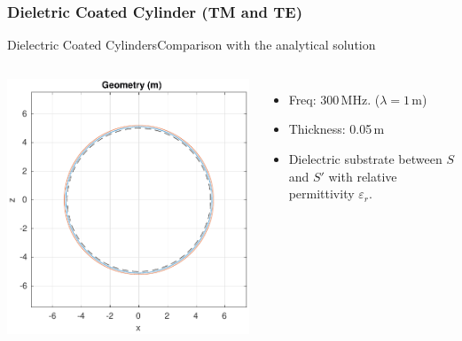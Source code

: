   \subsubsection{Dieletric Coated Cylinder (TM and TE)}
  
  \begin{frame}[allowframebreaks]{Dielectric Coated Cylinders}{Comparison with the analytical solution }

    
    \begin{columns}
      \includegraphics[width=\linewidth]{results/TMc4/geometry.pdf}
      
      \begin{itemize}
      \item
        Freq: 300\,MHz. ($\lambda=1\,$m)
      \item
        Thickness: 0.05\,m
      \item
        Dielectric substrate between $S$ and $S'$ with relative permittivity 
        $\varepsilon_r$.
      \end{itemize}
    \end{columns}


\end{frame}
